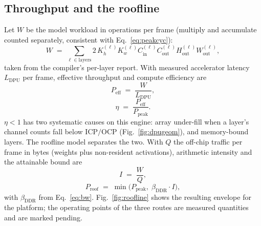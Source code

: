 \documentclass[onecolumn,journal]{IEEEtran}
\newcommand{\Ppeak}{P_{\mathrm{peak}}}
\begin{document}
\subsection{Throughput and the roofline}
Let $W$ be the model workload in operations per frame (multiply and accumulate counted
separately, consistent with Eq.~\eqref{eq:peakcyc}):
\begin{equation}
W \;=\; \sum_{\ell\in\text{layers}} 2\, K_h^{(\ell)} K_w^{(\ell)}
C_{\mathrm{in}}^{(\ell)} C_{\mathrm{out}}^{(\ell)} H_{\mathrm{out}}^{(\ell)}
W_{\mathrm{out}}^{(\ell)} ,
\label{eq:work}
\end{equation}
taken from the compiler's per-layer report. With measured accelerator latency
$L_{\mathrm{DPU}}$ per frame, effective throughput and compute efficiency are
\begin{equation}
P_{\mathrm{eff}} \;=\; \frac{W}{L_{\mathrm{DPU}}},
\label{eq:peff}
\end{equation}
\begin{equation}
\eta \;=\; \frac{P_{\mathrm{eff}}}{\Ppeak}.
\label{eq:eta}
\end{equation}
$\eta<1$ has two systematic causes on this engine: array under-fill when a layer's
channel counts fall below $\mathrm{ICP}/\mathrm{OCP}$ (Fig.~\ref{fig:dpugeom}), and
memory-bound layers. The roofline model \cite{zhang2015optimizing} separates the two.
With $Q$ the off-chip traffic per frame in bytes (weights plus non-resident
activations), arithmetic intensity and the attainable bound are
\begin{equation}
I \;=\; \frac{W}{Q},
\label{eq:ai}
\end{equation}
\begin{equation}
P_{\mathrm{roof}} \;=\; \min\!\big(\Ppeak,\; \beta_{\mathrm{DDR}} \cdot I\big),
\label{eq:roof}
\end{equation}
with $\beta_{\mathrm{DDR}}$ from Eq.~\eqref{eq:bw}. Fig.~\ref{fig:roofline} shows the
resulting envelope for the platform; the operating points of the three routes are
measured quantities and are marked pending.
\end{document}
